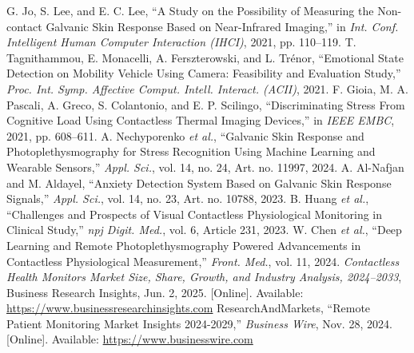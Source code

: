 \documentclass[12pt]{article}
\begin{document}
    \begin{thebibliography}{99}
         G. Jo, S. Lee, and E. C. Lee, ``A Study on the Possibility of Measuring the Non-contact Galvanic Skin Response Based on Near-Infrared Imaging,'' in \emph{Int. Conf. Intelligent Human Computer Interaction (IHCI)}, 2021, pp. 110--119.
         T. Tagnithammou, E. Monacelli, A. Ferszterowski, and L. Trénor, ``Emotional State Detection on Mobility Vehicle Using Camera: Feasibility and Evaluation Study,'' \emph{Proc. Int. Symp. Affective Comput. Intell. Interact. (ACII)}, 2021.
         F. Gioia, M. A. Pascali, A. Greco, S. Colantonio, and E. P. Scilingo, ``Discriminating Stress From Cognitive Load Using Contactless Thermal Imaging Devices,'' in \emph{IEEE EMBC}, 2021, pp. 608--611.
         A. Nechyporenko \emph{et al.}, ``Galvanic Skin Response and Photoplethysmography for Stress Recognition Using Machine Learning and Wearable Sensors,'' \emph{Appl. Sci.}, vol. 14, no. 24, Art. no. 11997, 2024.
         A. Al-Nafjan and M. Aldayel, ``Anxiety Detection System Based on Galvanic Skin Response Signals,'' \emph{Appl. Sci.}, vol. 14, no. 23, Art. no. 10788, 2023.
         B. Huang \emph{et al.}, ``Challenges and Prospects of Visual Contactless Physiological Monitoring in Clinical Study,'' \emph{npj Digit. Med.}, vol. 6, Article 231, 2023.
         W. Chen \emph{et al.}, ``Deep Learning and Remote Photoplethysmography Powered Advancements in Contactless Physiological Measurement,'' \emph{Front. Med.}, vol. 11, 2024.
         \emph{Contactless Health Monitors Market Size, Share, Growth, and Industry Analysis, 2024--2033}, Business Research Insights, Jun. 2, 2025. [Online]. Available: \url{https://www.businessresearchinsights.com}
         ResearchAndMarkets, ``Remote Patient Monitoring Market Insights 2024-2029,'' \emph{Business Wire}, Nov. 28, 2024. [Online]. Available: \url{https://www.businesswire.com}
    \end{thebibliography}
\end{document}
